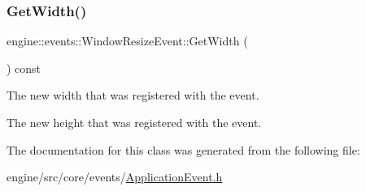 \subsubsection{\texorpdfstring{Get\+Width()}{GetWidth()}}
{\footnotesize\ttfamily engine\+::events\+::\+Window\+Resize\+Event\+::\+Get\+Width (\begin{DoxyParamCaption}{ }\end{DoxyParamCaption}) const\hspace{0.3cm}{\ttfamily [inline]}}



The new width that was registered with the event. 

The new height that was registered with the event. 

The documentation for this class was generated from the following file\+:\begin{DoxyCompactItemize}
\item 
engine/src/core/events/\hyperlink{ApplicationEvent_8h}{Application\+Event.\+h}\end{DoxyCompactItemize}
